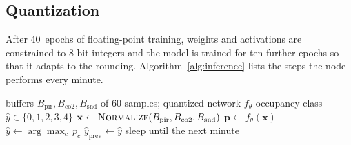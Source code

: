 \subsection{Quantization}
After 40~epochs of floating-point training, weights and activations are constrained to 8-bit integers and the model is trained for ten further epochs so that it adapts to the rounding. Algorithm~\ref{alg:inference} lists the steps the node performs every minute.

\begin{algorithm}[t]
\caption{Occupancy estimate on the node, run once per minute}
\label{alg:inference}
\begin{algorithmic}[1]
\Require buffers $B_{\mathrm{pir}}, B_{\mathrm{co2}}, B_{\mathrm{snd}}$ of 60 samples; quantized network $f_\theta$
\Ensure occupancy class $\hat{y} \in \{0, 1, 2, 3, 4\}$
\State $\mathbf{x} \gets \Call{Normalize}{B_{\mathrm{pir}}, B_{\mathrm{co2}}, B_{\mathrm{snd}}}$
\State $\mathbf{p} \gets f_\theta(\mathbf{x})$ 
\State $\hat{y} \gets \arg\max_c \, p_c$
  \State {}
  \State $\hat{y}_{\mathrm{prev}} \gets \hat{y}$
\EndIf
\State sleep until the next minute
\end{algorithmic}
\end{algorithm}
